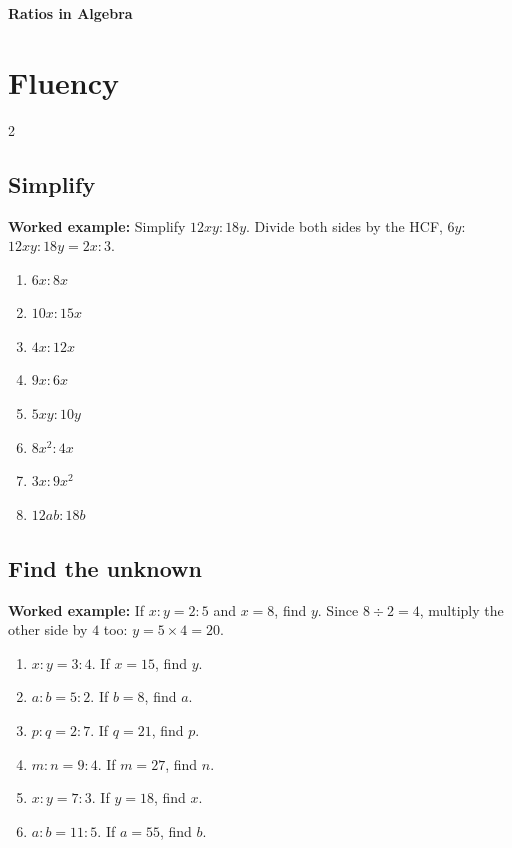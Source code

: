 \documentclass[11pt]{article}
\newcommand{\ans}{\hrulefill}
\newcommand{\anshere}{\par\vspace{0.9em}\noindent\ans\par\vspace{1.3em}}
\begin{document}
\thispagestyle{firstpage}

\begin{center}
  {\Large\bfseries Ratios in Algebra}
\end{center}
\vspace{0.2em}

\section*{Fluency}

\begin{multicols}{2}
\subsection*{Simplify}
\noindent\textbf{Worked example:} Simplify $12xy:18y$. Divide both sides by the HCF,
$6y$: $12xy:18y = 2x:3$.
\vspace{0.3em}
\begin{enumerate}[label=(\alph*)]
  \item $6x:8x$
  \anshere
  \item $10x:15x$
  \anshere
  \item $4x:12x$
  \anshere
  \item $9x:6x$
  \anshere
  \item $5xy:10y$
  \anshere
  \item $8x^2:4x$
  \anshere
  \item $3x:9x^2$
  \anshere
  \item $12ab:18b$
  \anshere
\end{enumerate}

\columnbreak

\subsection*{Find the unknown}
\noindent\textbf{Worked example:} If $x:y=2:5$ and $x=8$, find $y$. Since
$8\div 2=4$, multiply the other side by $4$ too: $y=5\times 4=20$.
\vspace{0.3em}
\begin{enumerate}[label=(\alph*)]
  \item $x:y=3:4$. If $x=15$, find $y$.
  \anshere
  \item $a:b=5:2$. If $b=8$, find $a$.
  \anshere
  \item $p:q=2:7$. If $q=21$, find $p$.
  \anshere
  \item $m:n=9:4$. If $m=27$, find $n$.
  \anshere
  \item $x:y=7:3$. If $y=18$, find $x$.
  \anshere
  \item $a:b=11:5$. If $a=55$, find $b$.
  \anshere
\end{enumerate}
\end{multicols}
\end{document}
